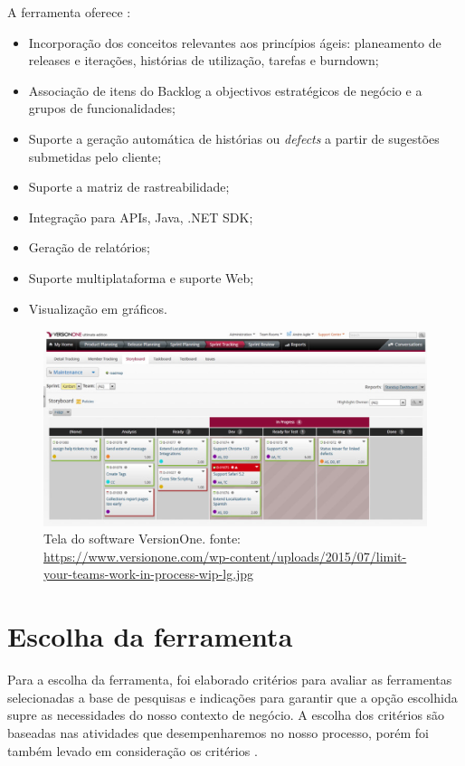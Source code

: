 A ferramenta oferece \cite{versionOne}:
\begin{itemize}
    \item Incorporação dos conceitos relevantes aos princípios ágeis: planeamento de releases e iterações, histórias de utilização, tarefas e burndown;
    \item Associação de itens do Backlog a objectivos estratégicos de negócio e a grupos de funcionalidades; 
    \item Suporte a geração automática de histórias ou \textit{defects} a partir de sugestões submetidas pelo cliente; 
    \item Suporte a matriz de rastreabilidade;
    \item Integração para APIs, Java, .NET SDK;
    \item Geração de relatórios;
    \item Suporte multiplataforma e suporte Web;
    \item Visualização em gráficos.
\end{itemize}

\begin{figure}[H]
    \centering
    \caption[Tela do software VersionOne]{Tela do software VersionOne. fonte: \url{https://www.versionone.com/wp-content/uploads/2015/07/limit-your-teams-work-in-process-wip-lg.jpg}}
    \label{versionOneFerramenta}
    \includegraphics[keepaspectratio=true,scale=0.8]{figuras/versionOne.eps}
\end{figure}

\section{Escolha da ferramenta}
    
Para a escolha da ferramenta, foi elaborado critérios para avaliar as ferramentas selecionadas a base de pesquisas e indicações para garantir que a opção escolhida supre as necessidades do nosso contexto de negócio. A escolha dos critérios são baseadas nas atividades que desempenharemos no nosso processo, porém foi também levado em consideração os critérios \cite{hoffmann2004}.

